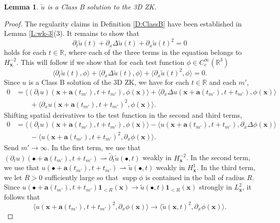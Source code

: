 \documentclass[12pt,letterpaper]{amsart}
\newcommand{\la}{\langle}
\newcommand{\ra}{\rangle}
\newcommand{\supp}{\operatorname{supp}}
\newtheorem{lemma}[theorem]{Lemma}
\theoremstyle{remark}
\numberwithin{equation}{section}
\numberwithin{theorem}{section}
\numberwithin{table}{section}
\begin{document}
\begin{lemma}
\label{L:wk-5}
$\tilde u$ is a Class B solution to the 3D ZK.
\end{lemma}
\begin{proof}
The regularity claims in Definition \ref{D:ClassB} have been established in Lemma \ref{L:wk-3}(3).  It remains to show that
$$
\partial_t \tilde u(t) + \partial_x \Delta \tilde u(t) + \partial_x \tilde u(t)^2=0
$$
holds for each $t\in \mathbb{R}$, where each of the three terms in the equation belongs to $H_{\mathbf{x}}^{-2}$.  This will follow if we show that for each test function $\phi \in C_c^\infty(\mathbb{R}^3)$ 
$$
\la \partial_t \tilde u(t), \phi \ra + \la \partial_x \Delta \tilde u(t), \phi\ra + \la \partial_x \tilde u(t)^2, \phi\ra=0.
$$
Since $u$ is a Class B solution of the 3D ZK, we have for each $t\in \mathbb{R}$ and each $m'$,
\begin{align*}
0 &= \la (\partial_t u)(\mathbf{x}+ \mathbf{a}(t_{m'}),t+t_{m'}), \phi(\mathbf{x}) \ra + \la \partial_x \Delta u(\mathbf{x}+ \mathbf{a}(t_{m'}),t+t_{m'}), \phi(\mathbf{x}) \ra \\
& \qquad + \la \partial_x u(\mathbf{x}+ \mathbf{a}(t_{m'}),t+t_{m'})^2, \phi(\mathbf{x}) \ra.
\end{align*}
Shifting spatial derivatives to the test function in the second and third terms,
\begin{align*}
0 &= \la (\partial_t u)(\mathbf{x}+ \mathbf{a}(t_{m'}),t+t_{m'}), \phi(\mathbf{x}) \ra - \la u(\mathbf{x}+ \mathbf{a}(t_{m'}),t+t_{m'}), \partial_x \Delta \phi(\mathbf{x}) \ra \\
& \qquad - \la u(\mathbf{x}+ \mathbf{a}(t_{m'}),t+t_{m'})^2, \partial_x \phi(\mathbf{x}) \ra.
\end{align*}
Send $m'\to \infty$.  In the first term, we use that $(\partial_t u)(\bullet+ \mathbf{a}(t_{m'}),t+t_{m'}) \rightharpoonup \tilde \partial_t \tilde u(\bullet, t)$ weakly in $H_{\mathbf{x}}^{-2}$.  In the second term, we use that $u(\bullet+ \mathbf{a}(t_{m'}),t+t_{m'}) \rightharpoonup  \tilde u(\bullet, t)$ weakly in $H_{\mathbf{x}}^1$.  In the third term, we let $R>0$ sufficiently large so that $\supp \phi$ is contained in the ball of radius $R$.  Since $u(\bullet+ \mathbf{a}(t_{m'}),t+t_{m'})\mathbf{1}_{<R}(\mathbf{x}) \to \tilde u(\bullet, t)\mathbf{1}_{<R}(\mathbf{x}) $ strongly in $L_{\mathbf{x}}^2$, it follows that 
$$ 
\la u(\mathbf{x}+ \mathbf{a}(t_{m'}),t+t_{m'})^2, \partial_x \phi(\mathbf{x}) \ra \to  \la  \tilde u(\mathbf{x},t)^2, \partial_x \phi(\mathbf{x}) \ra.
$$
\end{proof}
\end{document}
